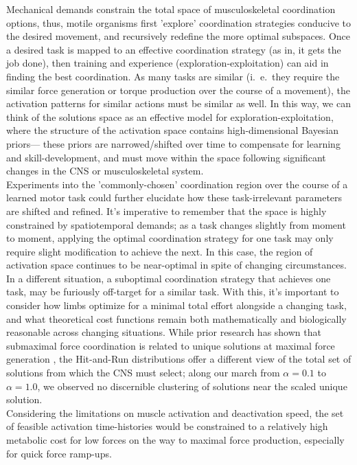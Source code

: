 Mechanical demands constrain the total space of musculoskeletal coordination options, thus, motile organisms first 'explore' coordination strategies conducive to the desired movement, and recursively redefine the more optimal subspaces.
Once a desired task is mapped to an effective coordination strategy (as in, it gets the job done), then training and experience (exploration-exploitation) can aid in finding the best coordination.
As many tasks are similar (i.\ e.\ they require the similar force generation or torque production over the course of a movement),  the activation patterns for similar actions must be similar as well.
In this way, we can think of the solutions space as an effective model for exploration-exploitation, where the structure of the activation space contains high-dimensional Bayesian priors--- these priors are narrowed/shifted over time to compensate for learning and skill-development, and must move within the space following significant changes in the CNS or musculoskeletal system.\\
Experiments into the 'commonly-chosen' coordination region over the course of a learned motor task could further elucidate how these task-irrelevant parameters are shifted and refined.
It's imperative to remember that the space is highly constrained by spatiotemporal demands;
as a task changes slightly from moment to moment, applying the optimal coordination strategy for one task may only require slight modification to achieve the next. In this case, the region of activation space continues to be near-optimal in spite of changing circumstances. In a different situation, a suboptimal coordination strategy that achieves one task, may be furiously off-target for a similar task.
With this, it's important to consider how limbs optimize for a minimal total effort alongside a changing task\cite{todorov2002optimal}, and what theoretical cost functions remain both mathematically and biologically reasonable across changing situations.
While prior research has shown that submaximal force coordination is related to unique solutions at maximal force generation \cite{Valero-Cuevas2000Scaling}, the Hit-and-Run distributions offer a different view of the total set of solutions from which the CNS must select; along our march from $\alpha=0.1$ to $\alpha =1.0$, we observed no discernible clustering of solutions near the scaled unique solution.\\
Considering the limitations on muscle activation and deactivation speed, the set of feasible activation time-histories would be constrained to a relatively high metabolic cost for low forces on the way to maximal force production, especially for quick force ramp-ups.

